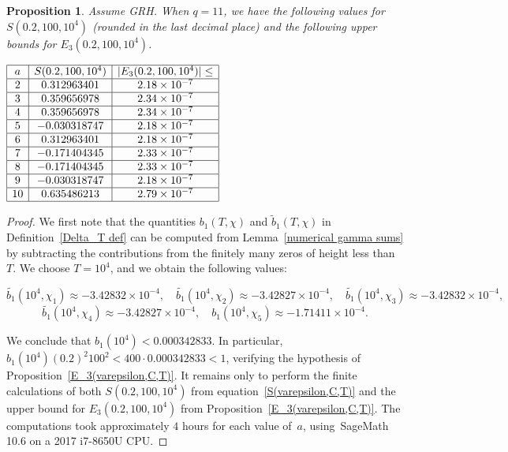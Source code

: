 \documentclass[11pt]{article}
\theoremstyle{plain}
\newtheorem{prop}[thm]{Proposition}
\theoremstyle{definition}
\numberwithin{equation}{section}
\newcommand{\0}{{\vec 0}}
\begin{document}
\begin{prop}
Assume GRH. When $q=11$, we have the following values for $S(0.2,100,10^4)$ (rounded in the last decimal place) and the following upper bounds for $E_3(0.2,100,10^4)$.
\begin{center}
$\begin{array}{ |c|c|c| } 
\hline
a & S(0.2,100,10^4) & |E_3(0.2,100,10^4)|\le \\  \hline
2 &0.312963401&2.18 \times10^{-7}\\ \hline
3 &0.359656978&2.34 \times10^{-7}\\ \hline
4 &0.359656978&2.34 \times10^{-7}\\ \hline
5 &-0.030318747&2.18 \times10^{-7}\\ \hline
6 &0.312963401&2.18 \times10^{-7}\\ \hline
7 &-0.171404345&2.33 \times10^{-7}\\ \hline
8 &-0.171404345&2.33 \times10^{-7}\\ \hline
9 &-0.030318747&2.18 \times10^{-7}\\ \hline
10&0.635486213&2.79\times10^{-7}\\ \hline
\end{array}$
\end{center}
\end{prop}

\begin{proof}
We first note that the quantities ${b}_1(T,\chi)$ and $\widetilde{b}_1(T,\chi)$ in Definition~\ref{Delta_T def} can be computed from Lemma~\ref{numerical gamma sums} by subtracting the contributions from the finitely many zeros of height less than~$T$.
We choose $T=10^4$, and we obtain the following values:

\[\tilde{b_1}(10^4,\chi_1)\approx -3.42832\times 10^{-4},\quad \tilde{b_1}(10^4,\chi_2)\approx -3.42827\times 10^{-4},\quad \tilde{b_1}(10^4,\chi_3)\approx -3.42832\times 10^{-4},\]
\[\tilde{b_1}(10^4,\chi_4)\approx -3.42827\times 10^{-4},\quad {b_1}(10^4,\chi_5)\approx -1.71411\times 10^{-4}.\]

We conclude that $\widehat{b}_1(10^4) < 0.000342833$. In particular, $\widehat{b}_1(10^4)(0.2)^2 100^2 < 400\cdot 0.000342833 <1$, verifying the hypothesis of Proposition~\ref{E_3(varepsilon,C,T)}. It remains only to perform the finite calculations of both $S(0.2,100,10^4)$ from equation~\eqref{S(varepsilon,C,T)} and the upper bound for $E_3(0.2,100,10^4)$ from Proposition~\ref{E_3(varepsilon,C,T)}. The computations took approximately $4$ hours for each value of~$a$, using~SageMath 10.6 on a 2017 i7-8650U CPU.
\end{proof}
\end{document}
